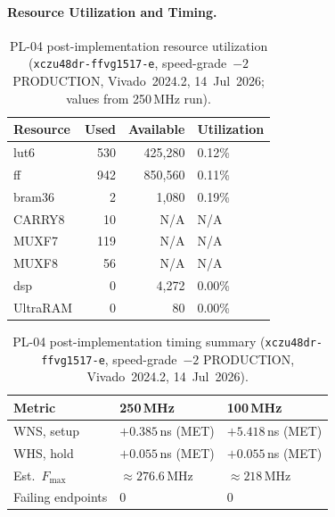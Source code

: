 \FloatBarrier


\paragraph{Resource Utilization and Timing.}
\leavevmode\par
\begin{table}[!h]
  \caption{PL-04 post-implementation resource utilization
           (\texttt{xczu48dr\allowbreak-ffvg1517\allowbreak-e}, speed-grade~$-2$
           PRODUCTION, Vivado~2024.2, 14~Jul~2026; values from
           250\,MHz run).}
  \label{tab:pl04_resources}
  \centering
  \begin{tabular}{lrrl}
    \hline
    Resource     & Used  & Available  & Utilization \\
    \hline
    \ac{lut6}    &  530  & 425{,}280  & 0.12\%      \\[2pt]
    \ac{ff}      &  942  & 850{,}560  & 0.11\%      \\[2pt]
    \ac{bram}36  &    2  & 1{,}080    & 0.19\%      \\[2pt]
    CARRY8       &   10  & N/A        & N/A          \\[2pt]
    MUXF7        &  119  & N/A        & N/A          \\[2pt]
    MUXF8        &   56  & N/A        & N/A          \\[2pt]
    \ac{dsp}     &    0  & 4{,}272    & 0.00\%       \\[2pt]
    UltraRAM     &    0  & 80         & 0.00\%       \\
    \hline
  \end{tabular}
\end{table}

\vspace{-30pt}
\leavevmode\par
\begin{table}[!h]
  \caption{PL-04 post-implementation timing summary
           (\texttt{xczu48dr\allowbreak-ffvg1517\allowbreak-e}, speed-grade~$-2$
           PRODUCTION, Vivado~2024.2, 14~Jul~2026).}
  \label{tab:pl04_timing}
  \centering
  \begin{tabular}{lll}
    \hline
    Metric             & 250\,MHz             & 100\,MHz            \\
    \hline
    WNS, setup         & $+0.385$\,ns (MET)   & $+5.418$\,ns (MET)  \\[2pt]
    WHS, hold          & $+0.055$\,ns (MET)   & $+0.055$\,ns (MET)  \\[2pt]
    Est.\ $F_{\max}$   & $\approx 276.6$\,MHz & $\approx 218$\,MHz   \\[2pt]
    Failing endpoints  & 0                    & 0                   \\
    \hline
  \end{tabular}
\end{table}
\FloatBarrier

